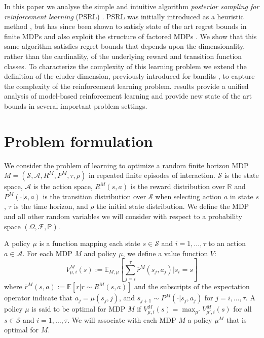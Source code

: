 \documentclass{article}
\newcommand{\Exp}{\mathds{E}}
\newcommand{\Real}{\mathds{R}}
\newcommand{\Sc}{\mathcal{S}}
\newcommand{\Ac}{\mathcal{A}}
\begin{document}
In this paper we analyse the simple and intuitive algorithm \emph{posterior sampling for reinforcement learning} (PSRL) \cite{thompson1933,strens2000bayesian,osband2013more}.
PSRL was initially introduced as a heuristic method \cite{strens2000bayesian}, but has since been shown to satisfy state of the art regret bounds in finite MDPs \cite{osband2013more} and also exploit the structure of factored MDPs    \cite{osband2014near}.
We show that this same algorithm satisfies regret bounds that depends upon the dimensionality, rather than the cardinality, of the underlying reward and transition function classes.
To characterize the complexity of this learning problem we extend the definition of the eluder dimension, previously introduced for bandits \cite{russo2013eluder}, to capture the complexity of the reinforcement learning problem.
results provide a unified analysis of model-based reinforcement learning and provide new state of the art bounds in several important problem settings.


\section{Problem formulation}

We consider the problem of learning to optimize a random finite horizon MDP $M = (\Sc, \Ac, R^M, P^M, \tau, \rho)$ in repeated finite episodes of interaction.
$\Sc$ is the state space, $\Ac$ is the action space, $R^M(s,a)$ is the reward distribution over $\Real$ and $P^M(\cdot|s,a)$ is the transition distribution over $\Sc$ when selecting action $a$ in state $s$, $\tau$ is the time horizon, and $\rho$ the initial state distribution.
We define the MDP and all other random variables we will consider with respect to a probability space $(\Omega, \mathscr{F}, \mathbb{P})$.

A policy $\mu$ is a function mapping each state $s \in \Sc$ and $i = 1,\ldots,\tau$ to an action $a \in \Ac$.
For each MDP $M$ and policy $\mu$, we define a value function $V$:
\begin{equation}
\label{eq: value fn}
V^{M}_{\mu, i}(s) := \Exp_{M,\mu}\left[ \sum_{j=i}^{\tau} \overline{r}^M(s_j,a_j) \Big| s_i = s \right]
\end{equation}
where $\overline{r}^M(s,a) := \Exp[r | r \sim R^M(s,a)]$ and the subscripts of the expectation operator indicate that $a_j = \mu(s_j, j)$, and $s_{j+1} \sim P^M(\cdot| s_j, a_j)$ for $j = i, \ldots, \tau$.  A policy $\mu$ is said to be optimal for MDP $M$ if $V^{M}_{\mu, i}(s) = \max_{\mu'} V^{M}_{\mu', i}(s)$ for all $s \in \Sc$ and $i=1,\ldots,\tau$. We will associate with each MDP $M$ a policy $\mu^M$ that is optimal for $M$.
\end{document}
